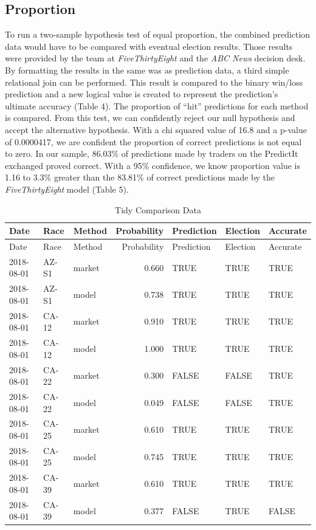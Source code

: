 \documentclass[11pt,]{article}
\begin{document}
\hypertarget{proportion}{%
\subsection{Proportion}\label{proportion}}

To run a two-sample hypothesis test of equal proportion, the combined
prediction data would have to be compared with eventual election
results. Those results were provided by the team at
\emph{FiveThirtyEight} and the \emph{ABC News} decision desk. By
formatting the results in the same was as prediction data, a third
simple relational join can be performed. This result is compared to the
binary win/loss prediction and a new logical value is created to
represent the prediction's ultimate accuracy (Table 4). The proportion
of ``hit'' predictions for each method is compared. From this test, we
can confidently reject our null hypothesis and accept the alternative
hypothesis. With a chi squared value of 16.8 and a p-value of 0.0000417,
we are confident the proportion of correct predictions is not equal to
zero. In our sample, 86.03\% of predictions made by traders on the
PredictIt exchanged proved correct. With a 95\% confidence, we know
proportion value is 1.16 to 3.3\% greater than the 83.81\% of correct
predictions made by the \emph{FiveThirtyEight} model (Table 5).

\begin{longtable}[]{@{}lllrlll@{}}
\caption{Tidy Comparison Data}\tabularnewline
\toprule
Date & Race & Method & Probability & Prediction & Election &
Accurate\tabularnewline
\midrule
\endfirsthead
\toprule
Date & Race & Method & Probability & Prediction & Election &
Accurate\tabularnewline
\midrule
\endhead
2018-08-01 & AZ-S1 & market & 0.660 & TRUE & TRUE & TRUE\tabularnewline
2018-08-01 & AZ-S1 & model & 0.738 & TRUE & TRUE & TRUE\tabularnewline
2018-08-01 & CA-12 & market & 0.910 & TRUE & TRUE & TRUE\tabularnewline
2018-08-01 & CA-12 & model & 1.000 & TRUE & TRUE & TRUE\tabularnewline
2018-08-01 & CA-22 & market & 0.300 & FALSE & FALSE &
TRUE\tabularnewline
2018-08-01 & CA-22 & model & 0.049 & FALSE & FALSE & TRUE\tabularnewline
2018-08-01 & CA-25 & market & 0.610 & TRUE & TRUE & TRUE\tabularnewline
2018-08-01 & CA-25 & model & 0.745 & TRUE & TRUE & TRUE\tabularnewline
2018-08-01 & CA-39 & market & 0.610 & TRUE & TRUE & TRUE\tabularnewline
2018-08-01 & CA-39 & model & 0.377 & FALSE & TRUE & FALSE\tabularnewline
\bottomrule
\end{longtable}
\end{document}
